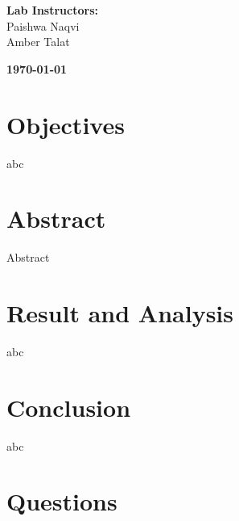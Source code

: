 \documentclass[a4paper, 12pt, english]{article}
\begin{document}
\begin{titlepage}
\begin{center}
        \vspace{45pt}
        \textbf {\large Lab Instructors:}\\[0.2cm]
        \Large {Paishwa Naqvi}\\[0.1cm]
        \Large {Amber Talat}\\[0.1cm]
    \end{center}

    \par
    \vfill
    \begin{center}
        \textbf{\today}\\
    \end{center}

\end{titlepage}



\newpage
\section{Objectives}
abc

\section{Abstract}
Abstract

\section{Result and Analysis}
abc

\section{Conclusion}
abc

\section{Questions}
\end{document}
